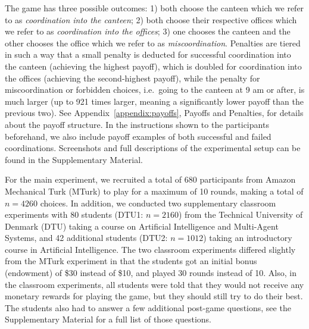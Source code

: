 \documentclass[twocolumn,a4paper,superscriptaddress,nofootinbib]{revtex4}
\newcommand{\tobo}[1]{{\color{red} TOBO: #1}}
\newcommand{\tsn}[1]{{\color{blue} TSN: #1}}
\begin{document}
The game has three possible outcomes: 1) both choose the canteen which we refer to as \emph{coordination into the canteen}; 2) both choose their respective offices which we refer to as \emph{coordination into the offices}; 3) one chooses the canteen and the other chooses the office which we refer to as \emph{miscoordination}. Penalties are tiered in such a way that a small penalty is deducted for successful coordination into the canteen (achieving the highest payoff), which is doubled for coordination into the offices (achieving the second-highest payoff), while the penalty for miscoordination or forbidden choices, i.e.\ going to the canteen at 9 am or after, is much larger (up to 921 times larger, meaning a significantly lower payoff than the previous two). See Appendix~\ref{appendix:payoffs}, Payoffs and Penalties, %
for details about the payoff structure. In the instructions shown to the participants beforehand, we also include payoff examples of both successful and failed coordinations. Screenshots and full descriptions of the experimental setup can be found in the Supplementary Material.

For the main experiment, we recruited a total of 680 participants from Amazon Mechanical Turk (MTurk) to play for a maximum of 10 rounds, making a total of $n=4260$ choices. In addition, we conducted two supplementary classroom experiments with 80 students (DTU1: $n=2160$) from the Technical University of Denmark (DTU) taking a course on Artificial Intelligence and Multi-Agent Systems, and 42 additional students (DTU2: $n=1012$) taking an introductory course in Artificial Intelligence. The two classroom experiments differed slightly from the MTurk experiment in that the students got an initial bonus (endowment) of \$30 instead of \$10, and played 30 rounds instead of 10. Also, in the classroom experiments, all students were told that they would not receive any monetary rewards for playing the game, but they should still try to do their best. The students also had to answer a few additional post-game questions, see the Supplementary Material for a full list of those questions.
\end{document}
